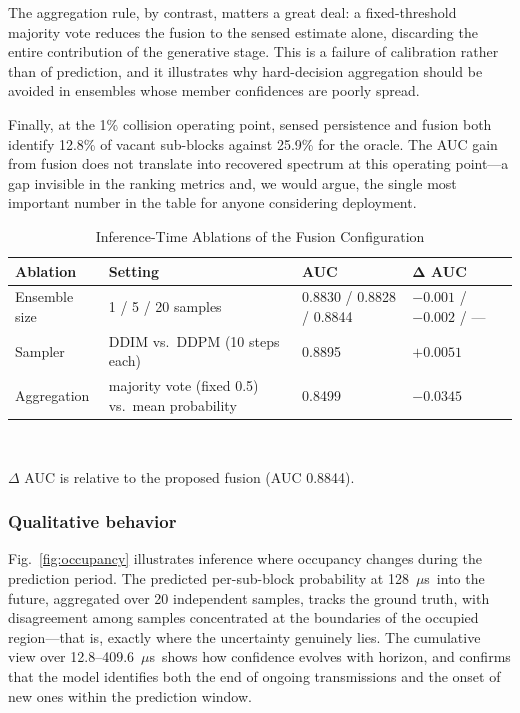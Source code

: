 \documentclass[lettersize,journal]{IEEEtran}
\newcommand{\us}{\ensuremath{\mu}s}
\begin{document}
The aggregation rule, by contrast, matters a great deal: a
fixed-threshold majority vote reduces the fusion to the sensed estimate
alone, discarding the entire contribution of the generative stage. This
is a failure of calibration rather than of prediction, and it illustrates
why hard-decision aggregation should be avoided in ensembles whose
member confidences are poorly spread.

Finally, at the 1\% collision operating point, sensed persistence and
fusion both identify 12.8\% of vacant sub-blocks against 25.9\% for the
oracle. The AUC gain from fusion does not translate into recovered
spectrum at this operating point---a gap invisible in the ranking
metrics and, we would argue, the single most important number in the
table for anyone considering deployment.

\begin{table}[t]
\centering
\caption{Inference-Time Ablations of the Fusion Configuration}
\label{tab:inference}
\renewcommand{\arraystretch}{1.25}
\begin{tabular}{@{}p{1.7cm}p{2.0cm}p{1.9cm}p{1.3cm}@{}}
\toprule
\textbf{Ablation} & \textbf{Setting} & \textbf{AUC} & $\mathbf{\Delta}$ \textbf{AUC} \\
\midrule
Ensemble size & 1 / 5 / 20 samples & 0.8830 / 0.8828 / 0.8844 &
$-0.001$ / $-0.002$ / --- \\
Sampler & DDIM vs.\ DDPM (10 steps each) & 0.8895 & $+0.0051$ \\
Aggregation & majority vote (fixed 0.5) vs.\ mean probability & 0.8499 &
$-0.0345$ \\
\bottomrule
\end{tabular}
\\[2pt]
\parbox{\columnwidth}{\footnotesize $\Delta$ AUC is relative to the
proposed fusion (AUC 0.8844).}
\end{table}

\subsubsection{Qualitative behavior}
Fig.~\ref{fig:occupancy} illustrates inference where occupancy changes
during the prediction period. The predicted per-sub-block probability at
128~\us\ into the future, aggregated over 20 independent samples,
tracks the ground truth, with disagreement among samples concentrated at
the boundaries of the occupied region---that is, exactly where the
uncertainty genuinely lies. The cumulative view over 12.8--409.6~\us\
shows how confidence evolves with horizon, and confirms that the model
identifies both the end of ongoing transmissions and the onset of new ones
within the prediction window.
\end{document}
